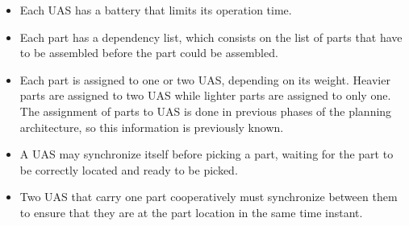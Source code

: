\documentclass[letterpaper, 12pt, conference]{ieeeconf}    %
\begin{document}
\begin{itemize}
  \item Each UAS has a battery that limits its operation time.
  \item Each part has a dependency list, which consists on the list of parts that have to be assembled before the part could be
  assembled.
  \item Each part is assigned to one or two UAS, depending on its weight. Heavier parts are assigned to two UAS while lighter
  parts are assigned to only one. The assignment of parts to UAS is done in previous phases of the planning architecture, so this information is previously known.
  \item A UAS may synchronize itself before picking a part, waiting for the part to be correctly located and ready to be picked.
  \item Two UAS that carry one part cooperatively must synchronize between them to ensure that they are at the part location in the same
  time instant.
\end{itemize}

%
\end{document}
